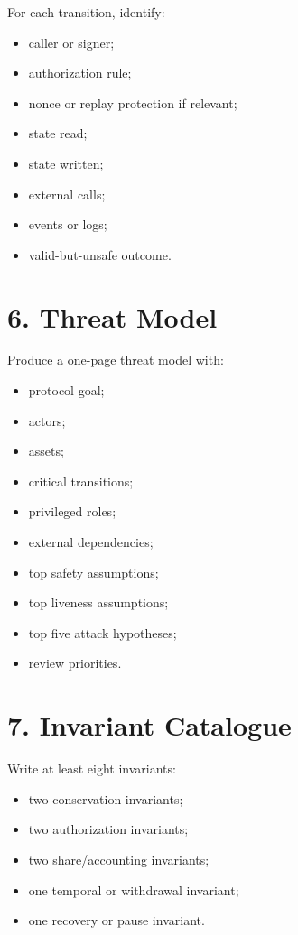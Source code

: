 For each transition, identify:

\begin{itemize}
\tightlist
\item
  caller or signer;
\item
  authorization rule;
\item
  nonce or replay protection if relevant;
\item
  state read;
\item
  state written;
\item
  external calls;
\item
  events or logs;
\item
  valid-but-unsafe outcome.
\end{itemize}

\section*{6. Threat Model}

Produce a one-page threat model with:

\begin{itemize}
\tightlist
\item
  protocol goal;
\item
  actors;
\item
  assets;
\item
  critical transitions;
\item
  privileged roles;
\item
  external dependencies;
\item
  top safety assumptions;
\item
  top liveness assumptions;
\item
  top five attack hypotheses;
\item
  review priorities.
\end{itemize}

\section*{7. Invariant Catalogue}

Write at least eight invariants:

\begin{itemize}
\tightlist
\item
  two conservation invariants;
\item
  two authorization invariants;
\item
  two share/accounting invariants;
\item
  one temporal or withdrawal invariant;
\item
  one recovery or pause invariant.
\end{itemize}

